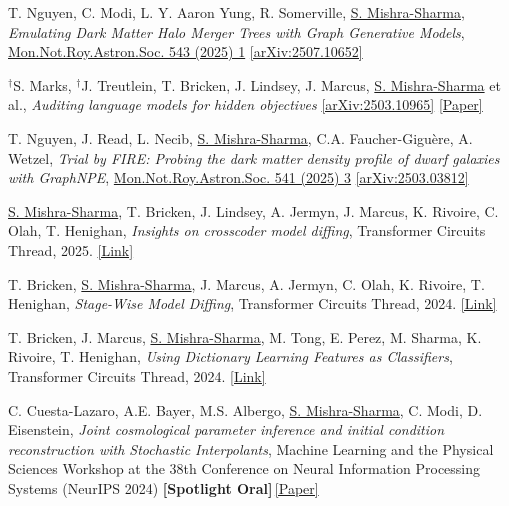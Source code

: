\documentclass[letterpaper,11pt]{article}
\newenvironment{packed_enumerate}[1][]{
\begin{etaremune}[#1]
  \setlength{\itemsep}{4.0pt}
  \setlength{\parskip}{0pt}
  \setlength{\parsep}{0pt}}{\end{etaremune}
}
\begin{document}
\begin{packed_enumerate}[start=63]
\item T. Nguyen, C. Modi, L. Y. Aaron Yung, R. Somerville, \underline{S. Mishra-Sharma}, \emph{Emulating Dark Matter Halo Merger Trees with Graph Generative Models}, \href{https://doi.org/10.1093/mnras/staf1487}{Mon.Not.Roy.Astron.Soc. 543 (2025) 1} \href{https://arxiv.org/abs/2507.10652}{[arXiv:2507.10652]}

\item $^{\dagger}$S. Marks, $^{\dagger}$J. Treutlein, T. Bricken, J. Lindsey, J. Marcus, \underline{S. Mishra-Sharma}  et al., \emph{Auditing language models for hidden objectives} \href{https://arxiv.org/abs/2503.10965}{[arXiv:2503.10965]} \href{https://assets.anthropic.com/m/317564659027fb33/original/Auditing-Language-Models-for-Hidden-Objectives.pdf}{[Paper]}

\item T. Nguyen, J. Read, L. Necib, \underline{S. Mishra-Sharma}, C.A. Faucher-Giguère, A. Wetzel, \emph{Trial by FIRE: Probing the dark matter density profile of dwarf galaxies with GraphNPE}, \href{https://doi.org/10.1093/mnras/staf1118}{Mon.Not.Roy.Astron.Soc. 541 (2025) 3} \href{https://arxiv.org/abs/2503.03812}{[arXiv:2503.03812]}

\item \underline{S. Mishra-Sharma}, T. Bricken, J. Lindsey, A. Jermyn, J. Marcus, K. Rivoire, C. Olah, T. Henighan, \emph{Insights on crosscoder model diffing}, Transformer Circuits Thread, 2025. \href{https://transformer-circuits.pub/2025/crosscoder-diffing-update/index.html}{[Link]}
\item T. Bricken, \underline{S. Mishra-Sharma}, J. Marcus, A. Jermyn, C. Olah, K. Rivoire, T. Henighan, \emph{Stage-Wise Model Diffing}, Transformer Circuits Thread, 2024. \href{https://transformer-circuits.pub/2024/model-diffing/index.html}{[Link]}
\item T. Bricken, J. Marcus, \underline{S. Mishra-Sharma}, M. Tong, E. Perez, M. Sharma, K. Rivoire, T. Henighan, \emph{Using Dictionary Learning Features as Classifiers}, Transformer Circuits Thread, 2024. \href{https://transformer-circuits.pub/2024/features-as-classifiers/index.html}{[Link]}

\item C. Cuesta-Lazaro, A.E. Bayer, M.S. Albergo, \underline{S. Mishra-Sharma}, C. Modi, D. Eisenstein, \emph{Joint cosmological parameter inference and initial condition reconstruction with Stochastic Interpolants}, Machine Learning and the Physical Sciences Workshop at the 38th Conference on Neural Information Processing Systems (NeurIPS 2024)  {\textbf{[Spotlight Oral]}}\,\href{https://ml4physicalsciences.github.io/2024/files/NeurIPS_ML4PS_2024_162.pdf}{[Paper]}
  

\end{packed_enumerate}
\end{document}
